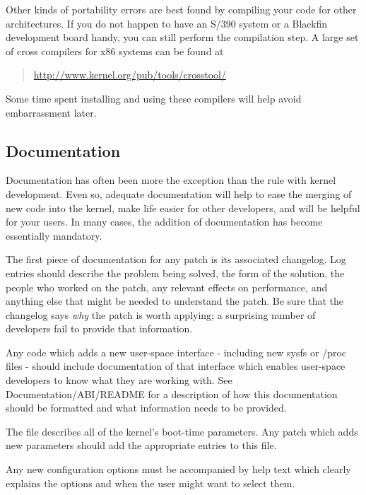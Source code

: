 \documentclass[a4paper,8pt,english]{sphinxmanual}
\begin{document}
Other kinds of portability errors are best found by compiling your code for
other architectures.  If you do not happen to have an S/390 system or a
Blackfin development board handy, you can still perform the compilation
step.  A large set of cross compilers for x86 systems can be found at
\begin{quote}

\href{http://www.kernel.org/pub/tools/crosstool/}{http://www.kernel.org/pub/tools/crosstool/}
\end{quote}

Some time spent installing and using these compilers will help avoid
embarrassment later.


\subsection{Documentation}
\label{process/4.Coding:documentation}
Documentation has often been more the exception than the rule with kernel
development.  Even so, adequate documentation will help to ease the merging
of new code into the kernel, make life easier for other developers, and
will be helpful for your users.  In many cases, the addition of
documentation has become essentially mandatory.

The first piece of documentation for any patch is its associated
changelog.  Log entries should describe the problem being solved, the form
of the solution, the people who worked on the patch, any relevant
effects on performance, and anything else that might be needed to
understand the patch.  Be sure that the changelog says \emph{why} the patch is
worth applying; a surprising number of developers fail to provide that
information.

Any code which adds a new user-space interface - including new sysfs or
/proc files - should include documentation of that interface which enables
user-space developers to know what they are working with.  See
Documentation/ABI/README for a description of how this documentation should
be formatted and what information needs to be provided.

The file  describes all of the kernel's boot-time parameters.
Any patch which adds new parameters should add the appropriate entries to
this file.

Any new configuration options must be accompanied by help text which
clearly explains the options and when the user might want to select them.
\end{document}
